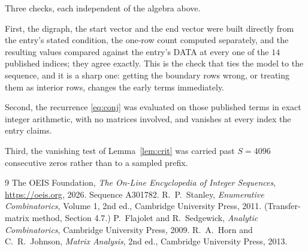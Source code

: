 \documentclass[11pt,a4paper]{article}
\theoremstyle{plain}
\theoremstyle{definition}
\begin{document}
Three checks, each independent of the algebra above.

First, the digraph, the start vector and the end vector were built directly from the
entry's stated condition, the one-row count computed separately, and the resulting values
compared against the entry's DATA at every one of the $14$ published indices; they
agree exactly. This is the check that ties the model to the sequence, and it is a sharp one:
getting the boundary rows wrong, or treating them as interior rows, changes the early terms
immediately.

Second, the recurrence \eqref{eq:conj} was evaluated on those published terms in exact
integer arithmetic, with no matrices involved, and vanishes at every index the entry claims.

Third, the vanishing test of Lemma~\ref{lem:crit} was carried past $S=4096$ consecutive
zeros rather than to a sampled prefix.

\begin{thebibliography}{9}
 The OEIS Foundation, \emph{The On-Line Encyclopedia of Integer
Sequences}, \url{https://oeis.org}, 2026. Sequence A301782.
 R.~P.~Stanley, \emph{Enumerative Combinatorics}, Volume 1, 2nd ed.,
Cambridge University Press, 2011. (Transfer-matrix method, Section 4.7.)
 P.~Flajolet and R.~Sedgewick, \emph{Analytic Combinatorics}, Cambridge
University Press, 2009.
 R.~A.~Horn and C.~R.~Johnson, \emph{Matrix Analysis}, 2nd ed., Cambridge
University Press, 2013.
\end{thebibliography}
\end{document}
